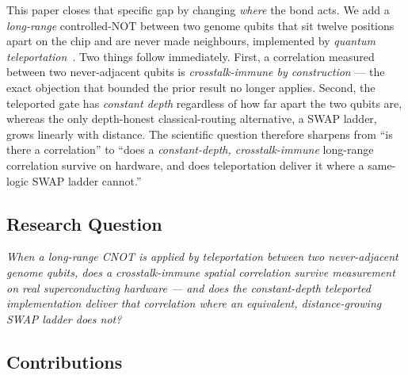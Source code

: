 \documentclass[conference]{IEEEtran}
\begin{document}
This paper closes that specific gap by changing \emph{where} the bond acts. We add a
\emph{long-range} controlled-NOT between two genome qubits that sit twelve positions apart
on the chip and are never made neighbours, implemented by \emph{quantum
teleportation}~\cite{gottesman1999}. Two things follow immediately. First, a correlation
measured between two never-adjacent qubits is \emph{crosstalk-immune by construction} ---
the exact objection that bounded the prior result no longer applies. Second, the teleported
gate has \emph{constant depth} regardless of how far apart the two qubits are, whereas the
only depth-honest classical-routing alternative, a SWAP ladder, grows linearly with
distance. The scientific question therefore sharpens from ``is there a correlation'' to
``does a \emph{constant-depth, crosstalk-immune} long-range correlation survive on
hardware, and does teleportation deliver it where a same-logic SWAP ladder cannot.''

\subsection*{Research Question}

\emph{When a long-range CNOT is applied by teleportation between two never-adjacent genome
qubits, does a crosstalk-immune spatial correlation survive measurement on real
superconducting hardware --- and does the constant-depth teleported implementation deliver
that correlation where an equivalent, distance-growing SWAP ladder does not?}

\subsection*{Contributions}
\end{document}
